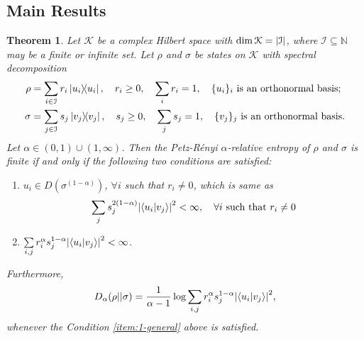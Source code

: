 \documentclass[12pt,a4paper,oneside]{article}
\numberwithin{equation}{section}
\theoremstyle{definition}  %
\theoremstyle{plain}  %
\newtheorem{thm}[defn]{Theorem}
\theoremstyle{remark} %
\newcommand{\CK}{\mathcal{K}}
\newcommand{\BN}{\mathbb{N}}
\begin{document}
\subsection{Main Results}
\begin{thm}\label{thm:the-formula-general}
Let $\CK$ be a complex Hilbert space with  $\dim \CK = \abs{\mathcal{I}}$, where $\mathcal{I}\subseteq \BN$ may be a finite or infinite set. Let $\rho$ and $\sigma$ be states on $\CK$  with spectral decomposition \begin{align}\label{eq:spectral-rho-sigma}\begin{split}
    \rho &= \sum_{i\in \mathcal{I}}r_i \ketbra{u_i}, \quad r_i\geq 0,\quad \sum_i r_i = 1,\quad \{u_i\}_{i} \text{ is an orthonormal basis};\\
    \sigma &= \sum_{j\in \mathcal{I}}s_j \ketbra{v_j}, \quad s_j\geq0, \quad \sum_j s_j = 1, \quad \{v_j\}_j\text{ is an orthonormal basis}.
    \end{split}
\end{align}
 Let $\alpha\in (0,1)\cup(1,\infty)$. Then the Petz-R\'enyi $\alpha$-relative entropy of $\rho$ and $\sigma$ is finite if and only if the following two conditions are satisfied: \begin{enumerate}
    \item\label{item:1-general} $u_i\in D(\sigma^{(1-\alpha)})$, $\forall i $ such that $r_i\neq 0$, which is same as \begin{equation}\label{eq:condition-1}
        \sum\limits_j s_j^{2(1-\alpha)}\abs{\braket{u_i}{v_j}}^2<\infty, \quad \forall i \text{ such that } r_i\neq 0
    \end{equation}
    \item \label{item:2-general}$\sum\limits_{i,j} r_i^{\alpha}s_j^{1-\alpha}\abs{\braket{u_i}{v_j}}^2 <\infty$.
\end{enumerate}
Furthermore, \begin{align}
    \label{eq:alpha-relative-entropy}
    D_{\alpha} (\rho \lvert\lvert \sigma) = \frac{1}{\alpha-1}\log \sum\limits_{i,j} r_i^{\alpha}s_j^{1-\alpha}\abs{\braket{u_i}{v_j}}^2,
\end{align}
whenever the Condition \ref{item:1-general} above is satisfied.
\end{thm}
\end{document}
